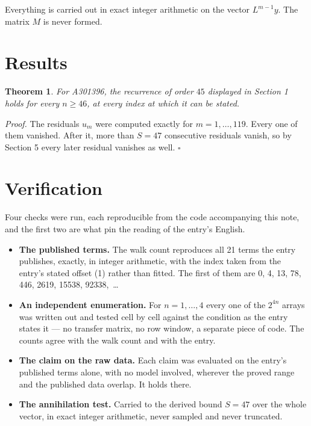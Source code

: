 \documentclass[11pt]{article}
\newtheorem{theorem}{Theorem}
\theoremstyle{definition}
\begin{document}
Everything is carried out in exact integer arithmetic on the vector $L^{m-1}y$. The matrix $M$ is never formed.

\section{Results}

\begin{theorem} For A301396, the recurrence of order $45$ displayed in Section 1 holds for every $n \ge 46$, at every index at which it can be stated.\end{theorem}

{\itshape Proof.} The residuals $u_m$ were computed exactly for $m = 1,\dots,119$. Every one of them vanished. After it, more than $S = 47$ consecutive residuals vanish, so by Section 5 every later residual vanishes as well. $\square$

\section{Verification}

Four checks were run, each reproducible from the code accompanying this note, and the first two are what pin the reading of the entry's English.

\begin{itemize}

\item {\bfseries The published terms.} The walk count reproduces all 21 terms the entry publishes, exactly, in integer arithmetic, with the index taken from the entry's stated offset (1) rather than fitted. The first of them are 0, 4, 13, 78, 446, 2619, 15538, 92338,~\dots

\item {\bfseries An independent enumeration.} For $n = 1,\dots,4$ every one of the $2^{4n}$ arrays was written out and tested cell by cell against the condition as the entry states it --- no transfer matrix, no row window, a separate piece of code. The counts agree with the walk count and with the entry.

\item {\bfseries The claim on the raw data.} Each claim was evaluated on the entry's published terms alone, with no model involved, wherever the proved range and the published data overlap. It holds there.

\item {\bfseries The annihilation test.} Carried to the derived bound $S = 47$ over the whole vector, in exact integer arithmetic, never sampled and never truncated.

\end{itemize}
\end{document}
